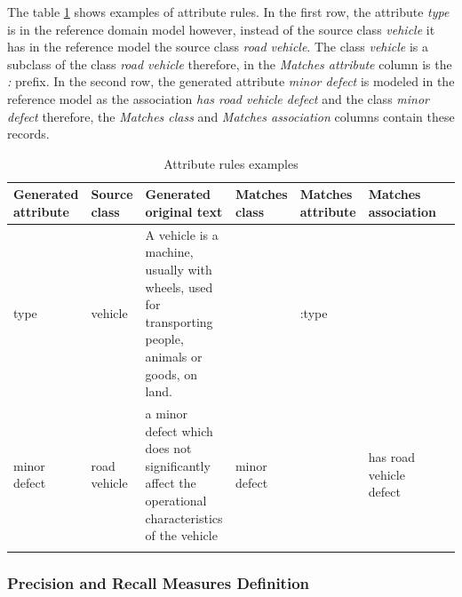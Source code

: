The table \ref{tab:attribute-rules} shows examples of attribute rules. In the first row, the attribute \textit{type} is in the reference domain model however, instead of the source class \textit{vehicle} it has in the reference model the source class \textit{road vehicle}. The class \textit{vehicle} is a subclass of the class \textit{road vehicle} therefore, in the \textit{Matches attribute} column is the \textit{:} prefix. In the second row, the generated attribute \textit{minor defect} is modeled in the reference model as the association \textit{has road vehicle defect} and the class \textit{minor defect} therefore, the \textit{Matches class} and \textit{Matches association} columns contain these records.


\begin{table}[!h]
    \scriptsize
    \centering
    \setlength{\tabcolsep}{0.5em}
\begin{tabular}{@{}l>{\raggedright\arraybackslash}p{}>{\raggedright\arraybackslash}p{}>{\raggedright\arraybackslash}p{}>{\raggedright\arraybackslash}p{}>{\raggedright\arraybackslash}p{}>{\raggedright\arraybackslash}p{}@{}}
         Generated attribute & Source class & Generated original text & Matches class & Matches attribute & Matches association \\
    \toprule
    \addlinespace

type & vehicle & A vehicle is a machine, usually with wheels, used for transporting people, animals or goods, on land. & & :type & \\

\addlinespace

minor defect & road vehicle &  a minor defect which does not significantly affect the operational characteristics of the vehicle & minor defect & & has road vehicle defect \\

	\addlinespace
	\bottomrule
	\addlinespace
	\end{tabular}
	\caption{Attribute rules examples}
	\label{tab:attribute-rules}
\end{table}


\subsubsection{Precision and Recall Measures Definition}

